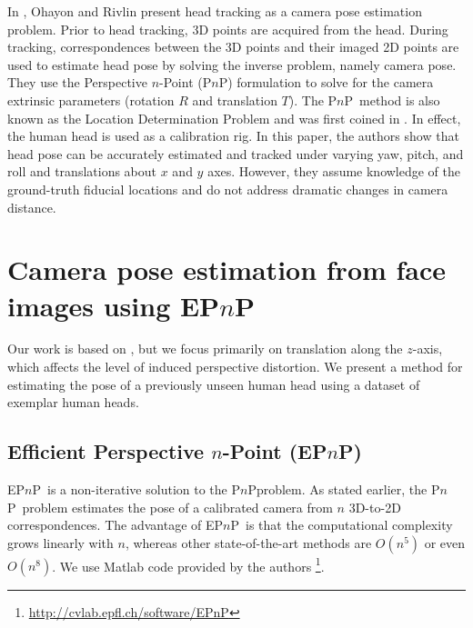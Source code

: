 \documentclass[runningheads]{llncs}
\newcommand {\PnP} {P$n$P}
\newcommand {\EPnP} {EP$n$P}
\begin{document}
In \cite{ohayon2006robust}, Ohayon and Rivlin present head tracking as a camera pose estimation problem.  
Prior to head tracking, 3D points are acquired from the head.  
During tracking, correspondences between the 3D points and their imaged 2D points are used to estimate head pose by solving the inverse problem, namely camera pose. 
They use the Perspective $n$-Point (\PnP) formulation to solve for the camera extrinsic parameters (rotation $R$ and translation $T$).  
The \PnP~method is also known as the Location Determination Problem and was first coined in \cite{ransac}.  
In effect, the human head is used as a calibration rig.  
In this paper, the authors show that head pose can be accurately estimated and tracked under varying yaw, pitch, and roll and translations about $x$ and $y$ axes. 
However, they assume knowledge of the ground-truth fiducial locations and do not address dramatic changes in camera distance.

\section{Camera pose estimation from face images using \EPnP} \label{sec:method}

Our work is based on \cite{ohayon2006robust}, but we focus primarily on translation along the $z$-axis, which affects the level of induced perspective distortion.  
We present a method for estimating the pose of a previously unseen human head using a dataset of exemplar human heads. 

\subsection{Efficient Perspective $n$-Point (\EPnP)}
\EPnP~is a non-iterative solution to the \PnP problem.  
As stated earlier, the \PnP~problem estimates the pose of a calibrated camera from $n$ 3D-to-2D correspondences.  
The advantage of \EPnP~is that the computational complexity grows linearly with $n$, whereas other state-of-the-art methods are $O(n^5)$ or even $O(n^8)$.  
We use Matlab code provided by the authors \footnote{\url{http://cvlab.epfl.ch/software/EPnP}}.
\end{document}
